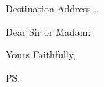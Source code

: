 \documentclass{letter}
\begin{document}
\begin{letter}{Destination Address...}
\opening{Dear Sir or Madam:}




\closing{Yours Faithfully,}
\ps



\end{letter}
\end{document}
